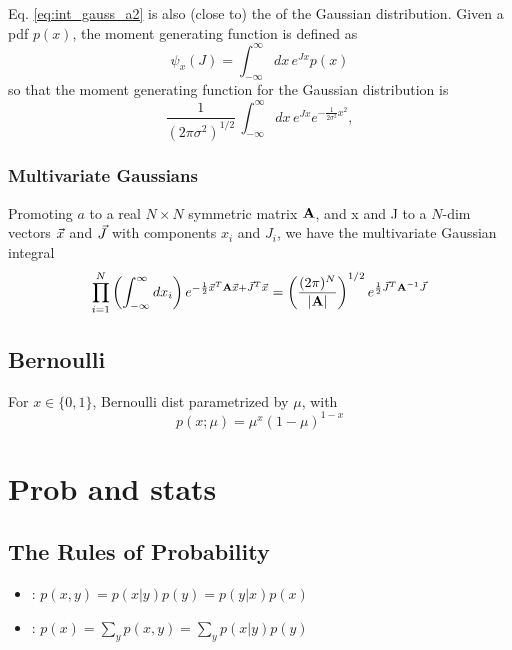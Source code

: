 \documentclass[11pt]{article}
\begin{document}
Eq. \ref{eq:int_gauss_a2} is also (close to) the  of
the Gaussian distribution. Given a pdf $p(x)$, the moment generating function is defined
as
\begin{equation}
  \psi_x(J) = \int_{-\infty}^{\infty} dx\, e^{J x} p(x)
\end{equation}
so that the moment generating function for the Gaussian distribution is
\begin{equation}
  \frac{1}{\left( 2 \pi \sigma^2 \right)^{1/2}}\, \int_{-\infty}^{\infty} dx\,
  e^{J x}  e^{-\frac{1}{2 \sigma^2} x^2}, 
\end{equation}

\subsubsection{Multivariate Gaussians}
Promoting $a$ to a real $N \times N$ symmetric matrix $\mathbf{A}$, and x and J to a $N$-dim
vectors $\vec{x}$ and $\vec{J}$ with components $x_i$ and $J_i$, we have the multivariate
Gaussian integral 
\begin{equation}
  \prod_{i=1}^N \left( \int_{-\infty}^{\infty} dx_i \right)
  e^{-\frac{1}{2} \vec{x}^T \mathbf{A} \vec{x} + \vec{J}^T \vec{x}} =
  \left( \frac{(2 \pi)^N}{|\mathbf{A}|} \right)^{1/2} e^{\frac{1}{2} \vec{J}^T \mathbf{A}^{-1} \vec{J}}
\end{equation}
\TODOFIN{}

\subsection{Bernoulli}
For $x \in \{0, 1\}$, Bernoulli dist parametrized by $\mu$, with
\begin{equation}
  p(x; \mu) = \mu^x (1-\mu)^{1-x}
\end{equation}


\section{Prob and stats}
\subsection{The Rules of Probability}
\begin{itemize}
  \item {}: $p(x, y) = p(x|y) p(y) = p(y|x) p(x)$
  \item {}: $p(x) = \sum\limits_y p(x, y) = \sum\limits_y p(x | y) p(y)$
\end{itemize}
\end{document}
